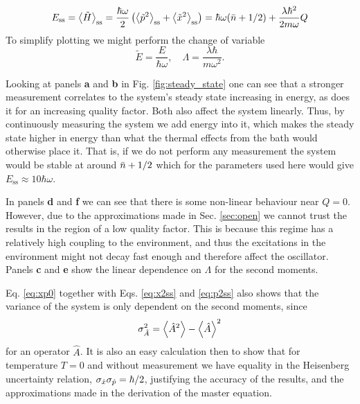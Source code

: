 \begin{equation}
    E_\mathrm{ss} = \expval{\tilde{H}}_\mathrm{ss} = \frac{\hbar \omega}{2} \left( \expval{\tilde{p}^2}_\text{ss} + \expval{\tilde{x}^2}_\text{ss} \right) = \hbar\omega (\bar{n} + 1/2)+ \frac{\lambda \hbar^2}{2 m\omega} Q
    \label{eq:ess}
\end{equation}
To simplify plotting we might perform the change of variable
\begin{equation}
    \tilde{E} =\frac{E}{\hbar\omega}, \quad \Lambda = \frac{\lambda \hbar}{m \omega^2}.
\end{equation}



Looking at panels \textbf{a} and \textbf{b} in Fig. \ref{fig:steady_state} one can see that a stronger measurement correlates to the system's steady state increasing in energy, as does it for an increasing quality factor. Both also affect the system linearly. Thus, by continuously measuring the system we add energy into it, which makes the steady state higher in energy than what the thermal effects from the bath would otherwise place it. That is, if we do not perform any measurement the system would be stable at around $\bar{n} + 1/2$ which for the parameters used here would give $E_\text{ss} \approx 10\hbar\omega$.

In panels \textbf{d} and \textbf{f} we can see that there is some non-linear behaviour near $Q = 0$. However, due to the approximations made in Sec. \ref{sec:open} we cannot trust the results in the region of a low quality factor. This is because this regime has a relatively high coupling to the environment, and thus the excitations in the environment might not decay fast enough and therefore affect the oscillator. Panels \textbf{c} and \textbf{e} show the linear dependence on $\Lambda$ for the second moments.


Eq. \eqref{eq:xp0} together with Eqs. \eqref{eq:x2ss} and \eqref{eq:p2ss} also shows that the variance of the system is only dependent on the second moments, since
\begin{equation}
    \sigma^2_{\hat{A}} = \expval{\hat{A}^2} - \expval{\hat{A}}^2
\end{equation}
for an operator $\hat{A}$. It is also an easy calculation then to show that for temperature $T=0$ and without measurement we have equality in the Heisenberg uncertainty relation, $\sigma_{\hat{x}} \sigma_{\hat{p}} = \hbar/2$, justifying the accuracy of the results, and the approximations made in the derivation of the master equation.

